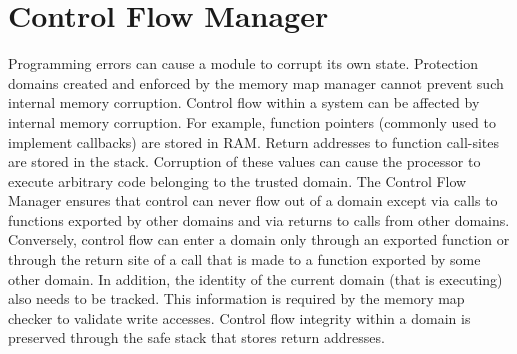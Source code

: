 \section{Control Flow Manager}
\label{sec:cross_domain_linking}
%
Programming errors can cause a module to corrupt its own state.
%
Protection domains created and enforced by the memory map manager cannot prevent such internal memory corruption.
%
Control flow within a system can be affected by internal memory corruption.
%
For example, function pointers (commonly used to implement callbacks) are stored in RAM.
%
Return addresses to function call-sites are stored in the stack.
%
Corruption of these values can cause the processor to execute arbitrary code belonging to the trusted domain.
%
%
The Control Flow Manager ensures that control can never flow out of a domain except via calls to functions exported by other domains and via returns to calls from other domains.
%
Conversely, control flow can enter a domain only through an exported function or through the return site of a call that is made to a function exported by some other domain.
%
In addition, the identity of the current domain (that is executing) also needs to be tracked.
%
This information is required by the memory map checker to validate write accesses.
%
%
%
Control flow integrity within a domain is preserved through the safe stack that stores return addresses.
%

